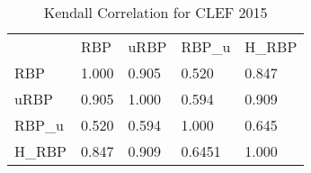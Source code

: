 

\begin{table}[]
\centering
\caption{Kendall Correlation for CLEF 2015}
\label{tab:kendall15}
\begin{tabular}{lllll}
       & RBP   & uRBP  & RBP\_u & H\_RBP \\
       RBP    & 1.000 & 0.905 & 0.520  & 0.847  \\
       uRBP   & 0.905 & 1.000 & 0.594  & 0.909  \\
       RBP\_u & 0.520 & 0.594 & 1.000  & 0.645  \\
       H\_RBP & 0.847 & 0.909 & 0.6451 & 1.000 
\end{tabular}
\end{table}


